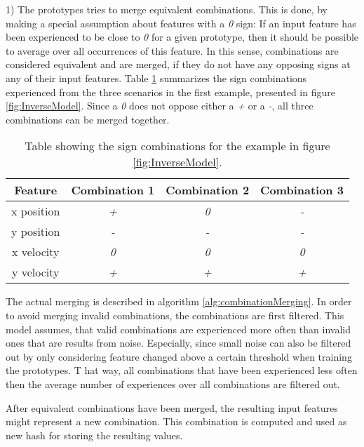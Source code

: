 1) The prototypes tries to merge equivalent combinations. This is done, by making a special assumption about features with a \textit{0} sign: If an input feature has been experienced to be close to \textit{0} for a given prototype, then it should be possible to average over all occurrences of this feature. 
In this sense, combinations are considered equivalent and are merged, if they do not have any opposing signs at any of their input features. 
Table \ref{tab:signCombinations2} summarizes the sign combinations experienced from the three scenarios in the first example, presented in figure \ref{fig:InverseModel}.
Since a \textit{0} does not oppose either a \textit{+} or a \textit{-}, all three combinations can be merged together.

\begin{table}
	\centering
	\begin{tabular}{|c|c|c|c|}
		\hline Feature & Combination 1 & Combination 2 & Combination 3 \\ 
		\hline x position & \textit{+} & \textit{0} & \textit{-} \\ 
		\hline y position & \textit{-} & \textit{-} & \textit{-} \\ 
		\hline x velocity & \textit{0} & \textit{0} & \textit{0} \\
		\hline y velocity & \textit{+} & \textit{+} & \textit{+} \\ 
		\hline 
	\end{tabular} 
	\caption{Table showing the sign combinations for the example in figure \ref{fig:InverseModel}.}
	\label{tab:signCombinations2}
\end{table}

The actual merging is described in algorithm \ref{alg:combinationMerging}. In order to avoid merging invalid combinations, the combinations are first filtered. This model assumes, that valid combinations are experienced more often than invalid ones that are results from noise. 
Especially, since small noise can also be filtered out by only considering feature changed above a certain threshold when training the prototypes. T
hat way, all combinations that have been experienced less often then the average number of experiences over all combinations are filtered out. 

After equivalent combinations have been merged, the resulting input features might represent a new combination. This combination is computed and used as new hash for storing the resulting values. 

